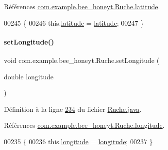Références \hyperlink{_ruche_8java_source_l00036}{com.\+example.\+bee\+\_\+honeyt.\+Ruche.\+latitude}.


\begin{DoxyCode}
00245     \{
00246         this.\hyperlink{classcom_1_1example_1_1bee__honeyt_1_1_ruche_a6a75dfabd9812334d502756f91fa4aa9}{latitude} = \hyperlink{classcom_1_1example_1_1bee__honeyt_1_1_ruche_a6a75dfabd9812334d502756f91fa4aa9}{latitude};
00247     \}
\end{DoxyCode}
\mbox{\label{classcom_1_1example_1_1bee__honeyt_1_1_ruche_aef8fc612e8ccdabd8234bff9b335925c}} 
\paragraph{\texorpdfstring{set\+Longitude()}{setLongitude()}}
{\footnotesize\ttfamily void com.\+example.\+bee\+\_\+honeyt.\+Ruche.\+set\+Longitude (\begin{DoxyParamCaption}\item[{double}]{longitude }\end{DoxyParamCaption})}



Définition à la ligne \hyperlink{_ruche_8java_source_l00234}{234} du fichier \hyperlink{_ruche_8java_source}{Ruche.\+java}.



Références \hyperlink{_ruche_8java_source_l00035}{com.\+example.\+bee\+\_\+honeyt.\+Ruche.\+longitude}.


\begin{DoxyCode}
00235     \{
00236         this.\hyperlink{classcom_1_1example_1_1bee__honeyt_1_1_ruche_aaeb7392ff8f3f26203e23f1dd57ae89f}{longitude} = \hyperlink{classcom_1_1example_1_1bee__honeyt_1_1_ruche_aaeb7392ff8f3f26203e23f1dd57ae89f}{longitude};
00237     \}
\end{DoxyCode}
\mbox{\label{classcom_1_1example_1_1bee__honeyt_1_1_ruche_ad98ddabc86442d12acd1047aa746138b}} 
